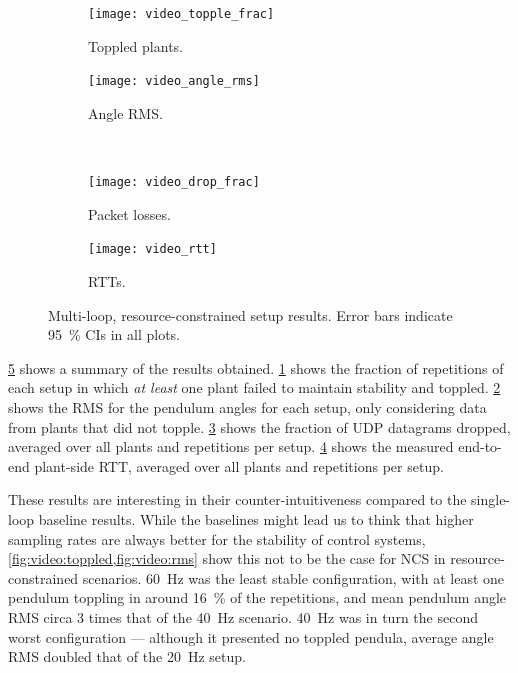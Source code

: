 \begin{figure}[t]
    \centering
    \begin{subfigure}[h]{.22\textwidth}
        \centering
        \texttt{[image: video\_topple\_frac]}
        \caption{Toppled plants.}\label{fig:video:toppled}
    \end{subfigure}%
    \hfill%
    \begin{subfigure}[h]{.22\textwidth}
        \centering
        \texttt{[image: video\_angle\_rms]}
        \caption{Angle \ac{RMS}.}\label{fig:video:rms}
    \end{subfigure}\\
    \begin{subfigure}[h]{.22\textwidth}
        \centering
        \texttt{[image: video\_drop\_frac]}
        \caption{Packet losses.}\label{fig:video:drop}
    \end{subfigure}%
    \hfill%
    \begin{subfigure}[h]{.22\textwidth}
        \centering
        \texttt{[image: video\_rtt]}
        \caption{\acsp{RTT}.}\label{fig:video:rtt}
    \end{subfigure}%
    \caption{
        Multi-loop, resource-constrained setup results.
        Error bars indicate \SI{95}{\percent} \acp{CI} in all plots.
    }\label{fig:video:results}
\end{figure}

\cref{fig:video:results} shows a summary of the results obtained.
\cref{fig:video:toppled} shows the fraction of repetitions of each setup in which \emph{at least} one plant failed to maintain stability and toppled.
\cref{fig:video:rms} shows the \ac{RMS} for the pendulum angles for each setup, only considering data from plants that did not topple.
\cref{fig:video:drop} shows the fraction of \ac{UDP} datagrams dropped, averaged over all plants and repetitions per setup.
\cref{fig:video:rtt} shows the measured end-to-end plant-side \ac{RTT}, averaged over all plants and repetitions per setup.

These results are interesting in their counter-intuitiveness compared to the single-loop baseline results.
While the baselines might lead us to think that higher sampling rates are always better for the stability of control systems, \cref{fig:video:toppled,fig:video:rms} show this not to be the case for \ac{NCS} in resource-constrained scenarios.
\SI{60}{\hertz} was the least stable configuration, with at least one pendulum toppling in around \SI{16}{\percent} of the repetitions, and mean pendulum angle \ac{RMS} circa \num{3} times that of the \SI{40}{\hertz} scenario.
\SI{40}{\hertz} was in turn the second worst configuration --- although it presented no toppled pendula, average angle \ac{RMS} doubled that of the \SI{20}{\hertz} setup.

